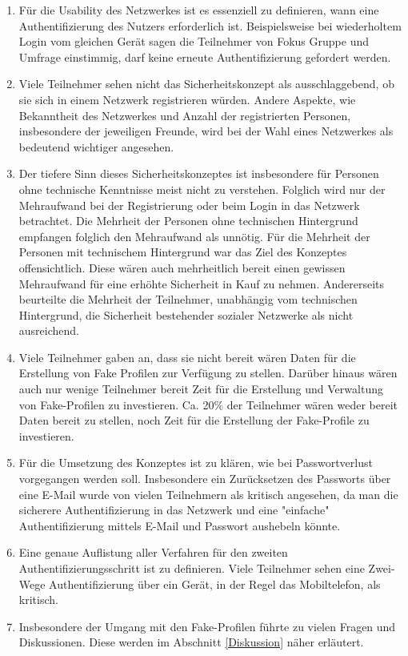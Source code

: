 \documentclass{sigchi}
\begin{document}
\begin{enumerate}
	\item Für die Usability des Netzwerkes ist es essenziell zu definieren, wann eine Authentifizierung des Nutzers erforderlich ist. Beispielsweise bei wiederholtem Login vom gleichen Gerät sagen die Teilnehmer von Fokus Gruppe und Umfrage einstimmig, darf keine erneute Authentifizierung gefordert werden. 
	\item Viele Teilnehmer sehen nicht das Sicherheitskonzept als ausschlaggebend, ob sie sich in einem Netzwerk registrieren würden. Andere Aspekte, wie Bekanntheit des Netzwerkes und Anzahl der registrierten Personen, insbesondere der jeweiligen Freunde, wird bei der Wahl eines Netzwerkes als bedeutend wichtiger angesehen.
	\item Der tiefere Sinn dieses Sicherheitskonzeptes ist insbesondere für Personen ohne technische Kenntnisse meist nicht zu verstehen. Folglich wird nur der Mehraufwand bei der Registrierung oder beim Login in das Netzwerk betrachtet. Die Mehrheit der Personen ohne technischen Hintergrund empfangen folglich den Mehraufwand als unnötig. Für die Mehrheit der Personen mit technischem Hintergrund war das Ziel des Konzeptes offensichtlich. Diese wären auch mehrheitlich bereit einen gewissen Mehraufwand für eine erhöhte Sicherheit in Kauf zu nehmen. Andererseits beurteilte die Mehrheit der Teilnehmer, unabhängig vom technischen Hintergrund, die Sicherheit bestehender sozialer Netzwerke als nicht ausreichend.
	\item Viele Teilnehmer gaben an, dass sie nicht bereit wären Daten für die Erstellung von Fake Profilen zur Verfügung zu stellen. Darüber hinaus wären auch nur wenige Teilnehmer bereit Zeit für die Erstellung und Verwaltung von Fake-Profilen zu investieren. Ca. 20\% der Teilnehmer wären weder bereit Daten bereit zu stellen, noch Zeit für die Erstellung der Fake-Profile zu investieren. 
	\item Für die Umsetzung des Konzeptes ist zu klären, wie bei Passwortverlust vorgegangen werden soll. Insbesondere ein Zurücksetzen des Passworts über eine E-Mail wurde von vielen Teilnehmern als kritisch angesehen, da man die sicherere Authentifizierung in das Netzwerk und eine "einfache" Authentifizierung mittels E-Mail und Passwort aushebeln könnte.
	\item Eine genaue Auflistung aller Verfahren für den zweiten Authentifizierungsschritt ist zu definieren. Viele Teilnehmer sehen eine Zwei-Wege Authentifizierung über ein Gerät, in der Regel das Mobiltelefon, als kritisch.
	\item Insbesondere der Umgang mit den Fake-Profilen führte zu vielen Fragen und Diskussionen. Diese werden im Abschnitt \ref{Diskussion} näher erläutert.
\end{enumerate}
\end{document}

